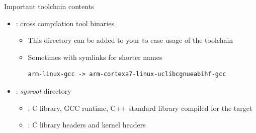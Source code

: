 \begin{frame}[fragile]{Important toolchain contents}
  \begin{itemize}
  \item {}: cross compilation tool binaries
    \begin{itemize}
    \item This directory can be added to your  to ease
      usage of the toolchain
    \item Sometimes with symlinks for shorter names
\begin{verbatim}
arm-linux-gcc -> arm-cortexa7-linux-uclibcgnueabihf-gcc
\end{verbatim}
    \end{itemize}
  \item {}: {\em sysroot} directory
    \begin{itemize}
    \item {}: C library, GCC runtime, C++
      standard library compiled for the target
    \item {}: C library headers
      and kernel headers
    \end{itemize}
  \end{itemize}
\end{frame}
